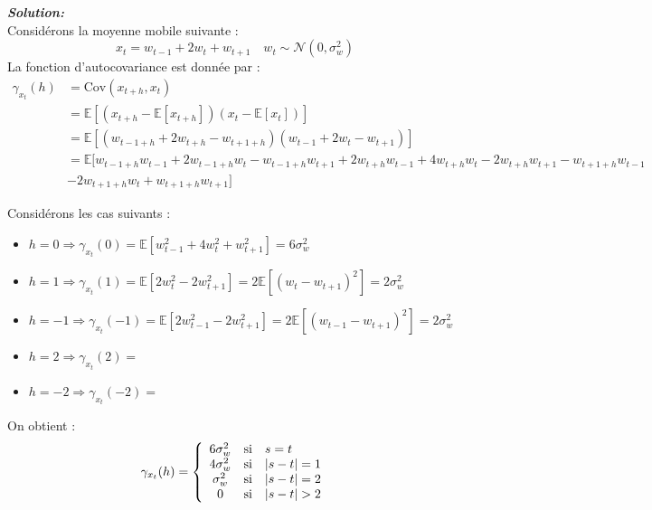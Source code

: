 \documentclass{homework}
\begin{document}
\textit{\textbf{Solution:}}\\
Considérons la moyenne mobile suivante : 
$$x_t = w_{t-1} + 2w_t + w_{t+1} \quad w_t \sim \mathcal{N}(0, \sigma^2_w)$$
La fonction d'autocovariance est donnée par :
\begin{align*}
\gamma_{x_t}(h) &= \text{Cov}(x_{t+h}, x_t) \\
          &= \mathbb{E}[(x_{t+h} - \mathbb{E}[x_{t+h}])(x_{t} - \mathbb{E}[x_{t}])] \\
          &= \mathbb{E}[(w_{t-1+h} + 2w_{t+h} - w_{t+1+h})(w_{t-1} + 2w_{t} - w_{t+1})] \\
          &= \mathbb{E}[w_{t-1+h}w_{t-1} + 2w_{t-1+h}w_t - w_{t-1+h}w_{t+1} + 2w_{t+h}w_{t-1} + 4w_{t+h}w_t - 2w_{t+h}w_{t+1} - w_{t+1+h}w_{t-1} \\
          &- 2w_{t+1+h}w_t + w_{t+1+h}w_{t+1}]
\end{align*}

Considérons les cas suivants :
\begin{itemize}
    \item[\textbullet] $h = 0 \Rightarrow \gamma_{x_t}(0) = \mathbb{E}[w_{t-1}^2 + 4w_t^2 + w_{t+1}^2] = 6\sigma_w^2$
    \item[\textbullet] $h = 1 \Rightarrow \gamma_{x_t}(1) = \mathbb{E}[2w_t^2 - 2w_{t+1}^2] = 2\mathbb{E}[(w_t - w_{t+1})^2] = 2\sigma_w^2 $
    \item[\textbullet] $h = -1 \Rightarrow \gamma_{x_t}(-1) = \mathbb{E}[2w_{t-1}^2 - 2w_{t+1}^2] = 2\mathbb{E}[(w_{t-1}-w_{t+1})^2] = 2\sigma_w^2$
    \item[\textbullet] $h = 2 \Rightarrow \gamma_{x_t}(2) =$
    \item[\textbullet] $h = -2 \Rightarrow \gamma_{x_t}(-2) =$
\end{itemize}
On obtient :
$$
\gamma_{x_t}(h) = 
\left\{ 
\begin{array}{c c l}
6\sigma_w^2 & \text{si} & s=t\\
4\sigma_w^2 & \text{si} & \vert s-t \vert = 1\\
\sigma_w^2  & \text{si} & \vert s-t \vert = 2\\
0           & \text{si} & \vert s-t \vert > 2\\
\end{array}
\right.
$$
\end{document}
